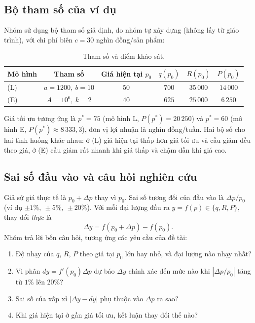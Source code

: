 \subsection{Bộ tham số của ví dụ}
Nhóm sử dụng bộ tham số giả định, do nhóm tự xây dựng (không lấy từ giáo trình), với
chi phí biên $c=30$ nghìn đồng/sản phẩm:

\begin{table}[h]
\centering
\caption{Tham số và điểm khảo sát.}\label{tab:par}
\begin{tabular}{@{}lccccc@{}}
\toprule
Mô hình & Tham số & Giá hiện tại $p_0$ & $q(p_0)$ & $R(p_0)$ & $P(p_0)$ \\
\midrule
(L) & $a=1200,\ b=10$ & $50$ & $700$ & $35\,000$ & $14\,000$ \\
(E) & $A=10^6,\ k=2$ & $40$ & $625$ & $25\,000$ & $6\,250$ \\
\bottomrule
\end{tabular}
\end{table}

Giá tối ưu tương ứng là $p^*=75$ (mô hình L, $P(p^*)=20\,250$) và $p^*=60$ (mô hình E,
$P(p^*)\approx 8\,333{,}3$), đơn vị lợi nhuận là nghìn đồng/tuần. Hai bộ số cho hai
tình huống khác nhau: ở (L) giá hiện tại thấp hơn giá tối ưu và cầu giảm đều theo giá,
ở (E) cầu giảm rất nhanh khi giá thấp và chậm dần khi giá cao.

\subsection{Sai số đầu vào và câu hỏi nghiên cứu}
Giả sử giá thực tế là $p_0+\Delta p$ thay vì $p_0$. Sai số tương đối của đầu vào là
$\Delta p/p_0$ (ví dụ $\pm 1\%,\ \pm 5\%,\ \pm 20\%$). Với mỗi đại lượng đầu ra
$y=f(p)\in\{q,R,P\}$, thay đổi \emph{thực} là
\begin{equation}
\Delta y = f(p_0+\Delta p) - f(p_0).
\end{equation}
Nhóm trả lời bốn câu hỏi, tương ứng các yêu cầu của đề tài:
\begin{enumerate}
  \item Độ nhạy của $q$, $R$, $P$ theo giá tại $p_0$ lớn hay nhỏ, và đại lượng nào nhạy nhất?
  \item Vi phân $dy=f'(p_0)\Delta p$ dự báo $\Delta y$ chính xác đến mức nào khi
        $|\Delta p/p_0|$ tăng từ $1\%$ lên $20\%$?
  \item Sai số của xấp xỉ $|\Delta y - dy|$ phụ thuộc vào $\Delta p$ ra sao?
  \item Khi giá hiện tại ở gần giá tối ưu, kết luận thay đổi thế nào?
\end{enumerate}

